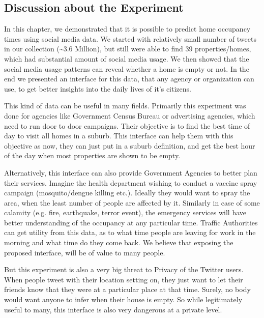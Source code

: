 \documentclass[12pt]{report}
\theoremstyle{named}
\begin{document}
\subsection{Discussion about the Experiment}
In this chapter, we demonstrated that it is possible to predict home occupancy times using social media data. We started with relatively small number of tweets in our collection (\textasciitilde 3.6 Million), but still were able to find 39 properties/homes, which had substantial amount of social media usage. We then showed that the social media usage patterns can reveal whether a home is empty or not. In the end we presented an interface for this data, that any agency or organization can use, to get better insights into the daily lives of it's citizens. 

This kind of data can be useful in many fields. Primarily this experiment was done for agencies like Government Census Bureau or advertising agencies, which need to run door to door campaigns. Their objective is to find the best time of day to visit all homes in a suburb. This interface can help them with this objective as now, they can just put in a suburb definition, and get the best hour of the day when most properties are shown to be empty.

Alternatively, this interface can also provide Government Agencies to better plan their services. Imagine the health department wishing to conduct a vaccine spray campaign (mosquito/dengue killing etc.). Ideally they would want to spray the area, when the least number of people are affected by it. Similarly in case of some calamity (e.g. fire, earthquake, terror event), the emergency services will have better understanding of the occupancy at any particular time. Traffic Authorities can get utility from this data, as to what time people are leaving for work in the morning and what time do they come back. We believe that exposing the proposed interface, will be of value to many people. 

But this experiment is also a very big threat to Privacy of the Twitter users. When people tweet with their location setting on, they just want to let their friends know that they were at a particular place at that time. Surely, no body would want anyone to infer when their house is empty. So while legitimately useful to many, this interface is also very dangerous at a private level.
\end{document}
